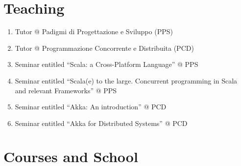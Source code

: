 \documentclass[11pt]{article}
\begin{document}
\section{Teaching}
\begin{enumerate}
	\item Tutor @ Padigmi di Progettazione e Sviluppo (PPS)
	\item Tutor @ Programmazione Concorrente e Distribuita (PCD)
	\item Seminar entitled ``Scala: a Cross-Platform Language'' @ PPS
	\item Seminar entitled ``Scala(e) to the large. Concurrent programming in Scala and relevant Frameworks'' @ PPS
	\item Seminar entitled ``Akka: An introduction'' @ PCD
	\item Seminar entitled ``Akka for Distributed Systems'' @ PCD
\end{enumerate}
\section{Courses and School}
\end{document}
